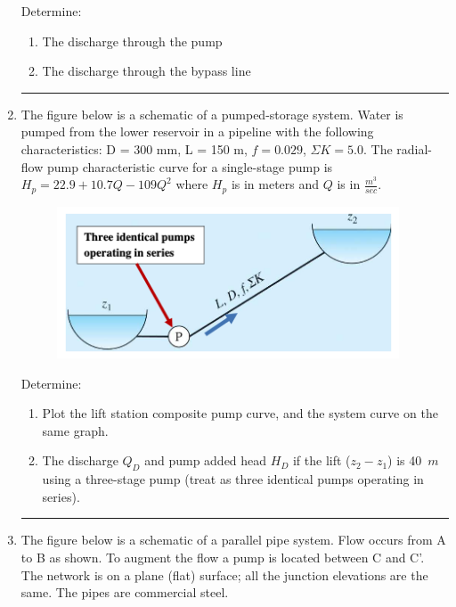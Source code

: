 \documentclass[12pt]{article}
\begin{document}
\begin{enumerate}
Determine:
\begin{enumerate}
\item The discharge through the pump
\item The discharge through the bypass line
\end{enumerate}

\noindent\rule{\linewidth}{0.4pt}
\clearpage
\item The figure below is a schematic of a pumped-storage system. Water is pumped from the lower reservoir in a pipeline with the following characteristics: D = 300 mm, L = 150 m, $f = 0.029$, $\Sigma K = 5.0$. The radial-flow pump characteristic curve for a single-stage pump is $H_p = 22.9 + 10.7Q -109Q^2$ where $H_p$ is in meters and $Q$ is in $\frac{m^3}{sec}$.

\begin{figure}[h!] %
   \centering
   \includegraphics[width=4in]{pss-2.png} 
   \caption{}
   \label{fig:pss-2}
\end{figure}

Determine:
\begin{enumerate}
\item Plot the lift station composite pump curve, and the system curve on the same graph. 
\item The discharge $Q_D$ and pump added head $H_D$ if the lift ($z_2 - z_1$) is 40~$m$ using a three-stage pump (treat as three identical pumps operating in series).
\end{enumerate}

\noindent\rule{\linewidth}{0.4pt}
\clearpage
\item The figure below is a schematic of a parallel pipe system.  Flow occurs from A to B as shown. To augment the flow a pump is located between C and C'. The network is on a plane (flat) surface; all the junction elevations are the same. The pipes are commercial steel.


\end{enumerate}
\end{document}
